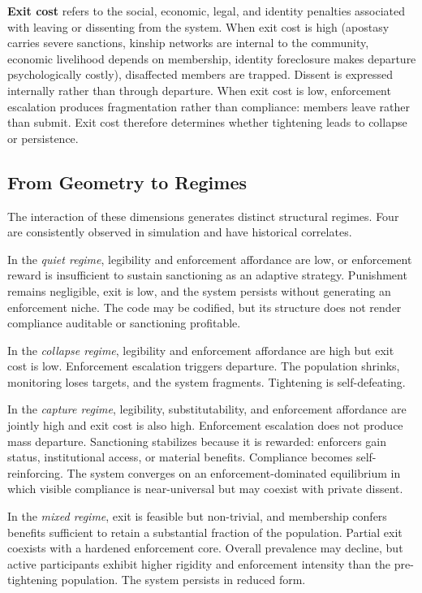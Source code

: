 \documentclass[12pt]{article}
\begin{document}
\textbf{Exit cost} refers to the social, economic, legal, and identity penalties associated with leaving or dissenting from the system. When exit cost is high (apostasy carries severe sanctions, kinship networks are internal to the community, economic livelihood depends on membership, identity foreclosure makes departure psychologically costly), disaffected members are trapped. Dissent is expressed internally rather than through departure. When exit cost is low, enforcement escalation produces fragmentation rather than compliance: members leave rather than submit. Exit cost therefore determines whether tightening leads to collapse or persistence.

\subsection{From Geometry to Regimes}

The interaction of these dimensions generates distinct structural regimes. Four are consistently observed in simulation and have historical correlates.

In the \textit{quiet regime}, legibility and enforcement affordance are low, or enforcement reward is insufficient to sustain sanctioning as an adaptive strategy. Punishment remains negligible, exit is low, and the system persists without generating an enforcement niche. The code may be codified, but its structure does not render compliance auditable or sanctioning profitable.

In the \textit{collapse regime}, legibility and enforcement affordance are high but exit cost is low. Enforcement escalation triggers departure. The population shrinks, monitoring loses targets, and the system fragments. Tightening is self-defeating.

In the \textit{capture regime}, legibility, substitutability, and enforcement affordance are jointly high and exit cost is also high. Enforcement escalation does not produce mass departure. Sanctioning stabilizes because it is rewarded: enforcers gain status, institutional access, or material benefits. Compliance becomes self-reinforcing. The system converges on an enforcement-dominated equilibrium in which visible compliance is near-universal but may coexist with private dissent.

In the \textit{mixed regime}, exit is feasible but non-trivial, and membership confers benefits sufficient to retain a substantial fraction of the population. Partial exit coexists with a hardened enforcement core. Overall prevalence may decline, but active participants exhibit higher rigidity and enforcement intensity than the pre-tightening population. The system persists in reduced form.
\end{document}
